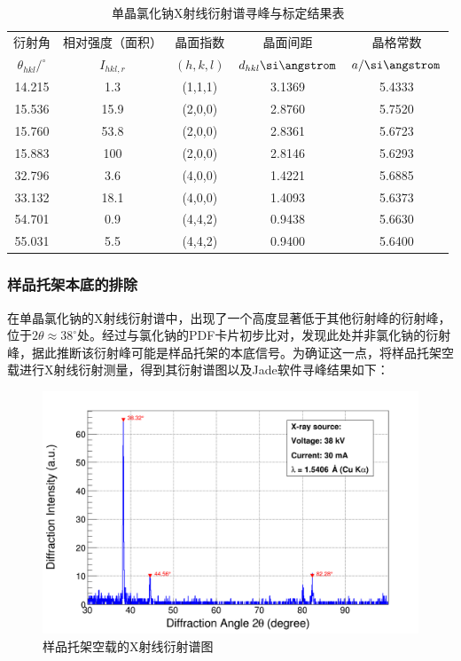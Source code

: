 \documentclass{thuemp}
\begin{document}
\begin{table}[H]
    \centering
    \captionnamefont{\wuhao\bf\heiti}
    \captiontitlefont{\wuhao\bf\heiti}
    \caption{单晶氯化钠X射线衍射谱寻峰与标定结果表}
    \label{tab:nacl_xrd_single}
    \liuhao
    \begin{tabular}{ccccc}
        \toprule
        衍射角 & 相对强度（面积）& 晶面指数 & 晶面间距 & 晶格常数 \\
        $\theta_{hkl}/^\circ$ & $I_{hkl,r}$ & $(h,k,l)$ & $d_{hkl}\text{\si\angstrom}$ & $a/\text{\si\angstrom}$ \\
        \midrule
        14.215 &  1.3 & (1,1,1) & 3.1369 & 5.4333\\
        15.536 & 15.9 & (2,0,0) & 2.8760 & 5.7520\\
        15.760 & 53.8 & (2,0,0) & 2.8361 & 5.6723\\
        15.883 &  100 & (2,0,0) & 2.8146 & 5.6293\\
        32.796 &  3.6 & (4,0,0) & 1.4221 & 5.6885\\
        33.132 & 18.1 & (4,0,0) & 1.4093 & 5.6373\\
        54.701 &  0.9 & (4,4,2) & 0.9438 & 5.6630\\
        55.031 &  5.5 & (4,4,2) & 0.9400 & 5.6400\\
        \bottomrule
    \end{tabular}
\end{table}

\subsubsection{样品托架本底的排除}

在单晶氯化钠的X射线衍射谱中，出现了一个高度显著低于其他衍射峰的衍射峰，位于$2\theta \approx 38^\circ$处。经过与氯化钠的PDF卡片初步比对，发现此处并非氯化钠的衍射峰，据此推断该衍射峰可能是样品托架的本底信号。为确证这一点，将样品托架空载进行X射线衍射测量，得到其衍射谱图以及Jade软件寻峰结果如下：

\begin{figure}[H]
    \centering
    \includegraphics[width=0.8\linewidth]{../Data/Background-from-manifold.png}
    \caption{样品托架空载的X射线衍射谱图}
    \label{fig:nacl_xrd_holder}
\end{figure}
\end{document}
